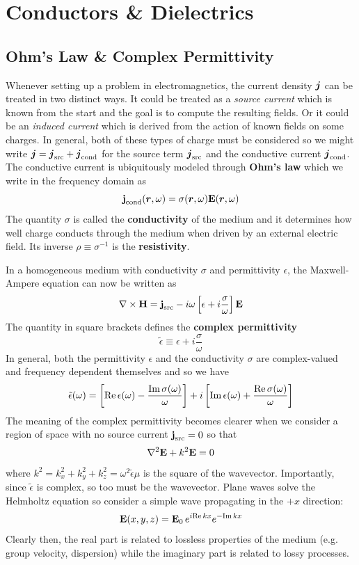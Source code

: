 \documentclass[twocolumn]{gwclass}
\newcommand{\bt}[1]{\text{\textbf{#1}}}
\begin{document}
	
	\section{Conductors \& Dielectrics}
	\subsection{Ohm's Law \& Complex Permittivity}
	Whenever setting up a problem in electromagnetics, the current density $\boldsymbol{j}$ can be treated in two distinct ways. It could be treated as a \emph{source current} which is known from the start and the goal is to compute the resulting fields. Or it could be an \emph{induced current} which is derived from the action of known fields on some charges. In general, both of these types of charge must be considered so we might write $\boldsymbol{j}=\boldsymbol{j}_{\text{\normalfont{src}}} + \boldsymbol{j}_{\text{\normalfont{cond}}}$ for the source term $\boldsymbol{j}_{\text{\normalfont{src}}}$ and the conductive current $\boldsymbol{j}_{\text{\normalfont{cond}}}$. The conductive current is ubiquitously modeled through \textbf{Ohm's law} which we write in the frequency domain as 
	$$ \bt{j}_\t{cond}(\*r,\omega) = \sigma(\*r,\omega)\bt{E}(\*r,\omega) $$
	The quantity $\sigma$ is called the \textbf{conductivity} of the medium and it determines how well charge conducts through the medium when driven by an external electric field. Its inverse $\rho\equiv\sigma^{-1}$ is the \textbf{resistivity}. 
	
	In a homogeneous medium with conductivity $\sigma$ and permittivity $\epsilon$, the Maxwell-Ampere equation can now be written as
	$$ \nabla\times\bt{H} = \bt{j}_\t{src} - i\omega\left[\epsilon + i\frac{\sigma}{\omega}\right]\bt{E} $$
	The quantity in square brackets defines the \textbf{complex permittivity}
	$$ \tilde{\epsilon} \equiv \epsilon + i\frac{\sigma}{\omega}$$
	In general, both the permittivity $\epsilon$ and the conductivity $\sigma$ are complex-valued and frequency dependent themselves and so we have
	$$ \tilde{\epsilon}(\omega) = \left[\text{\normalfont{Re}}\,\epsilon(\omega) - \frac{\text{\normalfont{Im}}\,\sigma(\omega)}{\omega}\right] + i \left[\text{\normalfont{Im}}\,\epsilon(\omega) + \frac{\text{\normalfont{Re}}\,\sigma(\omega)}{\omega}\right] $$
	The meaning of the complex permittivity becomes clearer when we consider a region of space with no source current $\bt{j}_\t{src}=0$ so that 
	$$ \nabla^2\bt{E} + k^2\bt{E} = 0 $$
	where $k^2=k_x^2 +k_y^2+k_z^2=\omega^2\tilde{\epsilon}\mu$ is the square of the wavevector. Importantly, since $\tilde{\epsilon}$ is complex, so too must be the wavevector. Plane waves solve the Helmholtz equation so consider a simple wave propagating in the $+x$ direction:
	$$  \bt{E}(x,y,z) = \bt{E}_0\,e^{i\t{Re}\,k x}e^{-\t{Im}\,kx}$$
	Clearly then, the real part is related to lossless properties of the medium (e.g. group velocity, dispersion) while the imaginary part is related to lossy processes. 
	
\end{document}
